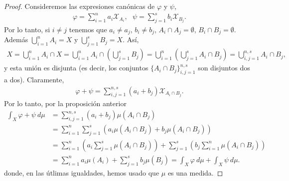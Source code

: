 \begin{proof}
Consideremos las expresiones canónicas de $\varphi$ y $\psi$,
\begin{align*}
    \varphi = \sum_{i=1}^{n}{a_i \mathcal{X}_{A_i}}, \ \ \ \psi = \sum_{j=1}^{s}{b_i \mathcal{X}_{B_j}}.
\end{align*}
Por lo tanto, si $i \not = j$ tenemos que $a_i \not = a_j$, $b_i \not = b_j$, $A_i \cap A_j = \emptyset$, $B_i \cap B_j = \emptyset$. Además $\bigcup_{i=1}^{n}{A_i} = X$ y $\bigcup_{j=1}^{s}{B_j} = X$. Así,
\begin{align*}
    X = \bigcup_{i=1}^{n}{A_i \cap X} = \bigcup_{i=1}^{n}{A_i \cap \left( \bigcup_{j=1}^{s}{B_j} \right)} = \bigcup_{i=1}^{n}{ \left( \bigcup_{j=1}^{s}{A_i \cap B_j} \right)} = \bigcup_{i,j=1}^{n,s}{A_i \cap B_j},
\end{align*}
y esta unión es disjunta (es decir, los conjuntos $\{ A_i \cap B_j\}_{i,j=1}^{n,s}$ son disjuntos dos a dos). Claramente,
\begin{align*}
    \varphi + \psi = \sum_{i,j=1}^{n,s}{(a_i + b_j)\mathcal{X}_{A_i \cap B_j}}.
\end{align*}
Por lo tanto, por la proposición anterior
\begin{align*}
    \int_{X}{\varphi + \psi \ d\mu} &= \sum_{i,j = 1}^{n,s}{(a_i + b_j)\mu(A_i \cap B_j)}\\
    &= \sum_{i=1}^{n}{\sum_{j=1}^{s}{(a_i\mu(A_i \cap B_j) + b_j\mu(A_i \cap B_j))}}\\
    &=\sum_{i=1}^{n}{ \left( a_i \sum_{j=1}^{s}{\mu(A_i \cap B_j)} \right)} + \sum_{j=1}^{s}{ \left( b_j\sum_{i=1}^{n}{\mu(A_i \cap B_j)} \right)}\\
    &= \sum_{i=1}^{n}{a_i\mu(A_i)} + \sum_{j=1}^{s}{b_j\mu(B_j)} = \int_{X}{\varphi \ d\mu} + \int_{X}{\psi \ d\mu}.
\end{align*}
donde, en las útlimas igualdades, hemos usado que $\mu$ es una medida.
\end{proof}

